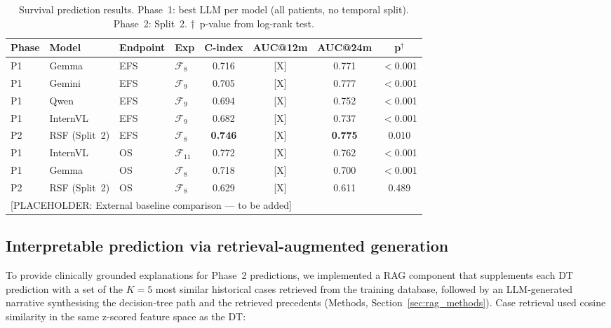 \documentclass[pdflatex,sn-nature]{sn-jnl}
\begin{document}
\begin{table}[ht]
\caption{Survival prediction results. Phase~1: best LLM per model
(all patients, no temporal split). Phase~2: Split~2.
$\dagger$~p-value from log-rank test.}
\label{tab:survival}
\centering
\small
\begin{tabular}{llllcccc}
\toprule
\textbf{Phase} & \textbf{Model} & \textbf{Endpoint}
  & \textbf{Exp} & \textbf{C-index}
  & \textbf{AUC@12m} & \textbf{AUC@24m} & \textbf{p$^\dagger$} \\
\midrule
P1 & Gemma          & EFS & $\mathcal{F}_8$  & 0.716 & [X] & 0.771 & $<$0.001 \\
P1 & Gemini         & EFS & $\mathcal{F}_9$  & 0.705 & [X] & 0.777 & $<$0.001 \\
P1 & Qwen           & EFS & $\mathcal{F}_9$  & 0.694 & [X] & 0.752 & $<$0.001 \\
P1 & InternVL       & EFS & $\mathcal{F}_9$  & 0.682 & [X] & 0.737 & $<$0.001 \\
\midrule
P2 & RSF (Split~2)  & EFS & $\mathcal{F}_8$  & \textbf{0.746} & [X] & \textbf{0.775} & 0.010 \\
\midrule
P1 & InternVL       & OS  & $\mathcal{F}_{11}$ & 0.772 & [X] & 0.762 & $<$0.001 \\
P1 & Gemma          & OS  & $\mathcal{F}_8$  & 0.718 & [X] & 0.700 & $<$0.001 \\
P2 & RSF (Split~2)  & OS  & $\mathcal{F}_8$  & 0.629 & [X] & 0.611 & 0.489 \\
\midrule
\multicolumn{8}{l}{[PLACEHOLDER: External baseline comparison — to be added]}\\
\bottomrule
\end{tabular}
\end{table}

\subsection{Interpretable prediction via retrieval-augmented generation}
\label{sec:rag}

To provide clinically grounded explanations for Phase~2 predictions,
we implemented a RAG component that supplements each DT prediction
with a set of the $K=5$ most similar historical cases retrieved from
the training database, followed by an LLM-generated narrative
synthesising the decision-tree path and the retrieved precedents
(Methods, Section~\ref{sec:rag_methods}).
Case retrieval used cosine similarity in the same z-scored feature
space as the DT:
\end{document}
